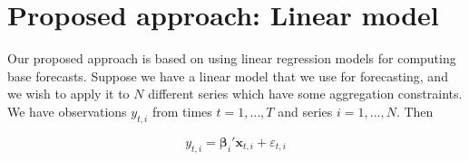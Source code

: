 \documentclass[11pt,a4paper,]{article}
\begin{document}
\hypertarget{proposed-approach-linear-model}{%
\section{\texorpdfstring{Proposed approach: Linear model \label{sec:proposedapproach1}}{Proposed approach: Linear model }}\label{proposed-approach-linear-model}}

Our proposed approach is based on using linear regression models for computing base forecasts. Suppose we have a linear model that we use for forecasting, and we wish to apply it to \(N\) different series which have some aggregation constraints. We have observations \(y_{t,i}\) from times \(t=1,\dots,T\) and series \(i=1,\dots,N\). Then

\begin{equation}
\label{eq:basicequation}
  y_{t,i} = \bm{\beta}_{i}' \bm{x}_{t,i} + \varepsilon_{t,i}
\end{equation}
\end{document}

